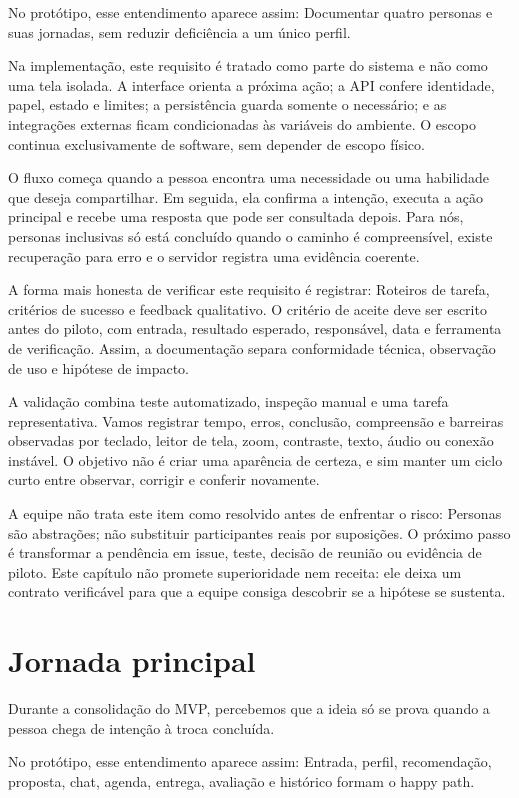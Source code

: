 \documentclass[12pt,oneside,a4paper,article]{abntex2}
\begin{document}
No protótipo, esse entendimento aparece assim: Documentar quatro personas e suas jornadas, sem reduzir deficiência a um único perfil.

Na implementação, este requisito é tratado como parte do sistema e não como uma tela isolada. A interface orienta a próxima ação; a API confere identidade, papel, estado e limites; a persistência guarda somente o necessário; e as integrações externas ficam condicionadas às variáveis do ambiente. O escopo continua exclusivamente de software, sem depender de escopo físico.

O fluxo começa quando a pessoa encontra uma necessidade ou uma habilidade que deseja compartilhar. Em seguida, ela confirma a intenção, executa a ação principal e recebe uma resposta que pode ser consultada depois. Para nós, personas inclusivas só está concluído quando o caminho é compreensível, existe recuperação para erro e o servidor registra uma evidência coerente.

A forma mais honesta de verificar este requisito é registrar: Roteiros de tarefa, critérios de sucesso e feedback qualitativo. O critério de aceite deve ser escrito antes do piloto, com entrada, resultado esperado, responsável, data e ferramenta de verificação. Assim, a documentação separa conformidade técnica, observação de uso e hipótese de impacto.

A validação combina teste automatizado, inspeção manual e uma tarefa representativa. Vamos registrar tempo, erros, conclusão, compreensão e barreiras observadas por teclado, leitor de tela, zoom, contraste, texto, áudio ou conexão instável. O objetivo não é criar uma aparência de certeza, e sim manter um ciclo curto entre observar, corrigir e conferir novamente.

A equipe não trata este item como resolvido antes de enfrentar o risco: Personas são abstrações; não substituir participantes reais por suposições. O próximo passo é transformar a pendência em issue, teste, decisão de reunião ou evidência de piloto. Este capítulo não promete superioridade nem receita: ele deixa um contrato verificável para que a equipe consiga descobrir se a hipótese se sustenta.

\section{Jornada principal}
Durante a consolidação do MVP, percebemos que a ideia só se prova quando a pessoa chega de intenção à troca concluída.

No protótipo, esse entendimento aparece assim: Entrada, perfil, recomendação, proposta, chat, agenda, entrega, avaliação e histórico formam o happy path.
\end{document}
